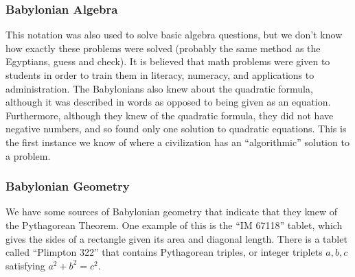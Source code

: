 \documentclass[class=article, crop=false]{standalone}
\begin{document}
  \subsubsection{Babylonian Algebra}
  This notation was also used to solve basic algebra questions, but we don't know how exactly these problems were solved (probably the same method as the Egyptians, guess and check). It is believed that math problems were given to students in order to train them in literacy, numeracy, and applications to administration. The Babylonians also knew about the quadratic formula, although it was described in words as opposed to being given as an equation. Furthermore, although they knew of the quadratic formula, they did not have negative numbers, and so found only one solution to quadratic equations. This is the first instance we know of where a civilization has an ``algorithmic'' solution to a problem.
  \subsubsection{Babylonian Geometry}
  We have some sources of Babylonian geometry that indicate that they knew of the Pythagorean Theorem. One example of this is the ``IM 67118'' tablet, which gives the sides of a rectangle given its area and diagonal length. There is a tablet called ``Plimpton 322'' that contains Pythagorean triples, or integer triplets $a, b, c$ satisfying $a^2 + b^2 = c^2$.
\end{document}

